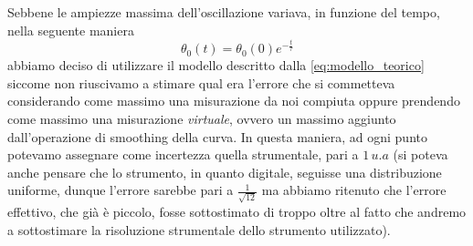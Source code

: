 \documentclass{article}
\begin{document}
Sebbene le ampiezze massima dell'oscillazione variava, in funzione del tempo, nella seguente maniera
$$
	\theta_0 (t) = \theta_0 (0) e^{-\frac{t}{\tau}}
$$
abbiamo deciso di utilizzare il modello descritto dalla \ref{eq:modello_teorico} siccome non riuscivamo a stimare qual era l'errore che si commetteva considerando come massimo una misurazione da noi compiuta oppure prendendo come massimo una misurazione \emph{virtuale}, ovvero un massimo aggiunto dall'operazione di smoothing della curva. In questa maniera, ad ogni punto potevamo assegnare come incertezza quella strumentale, pari a $1 \, u.a$ (si poteva anche pensare che lo strumento, in quanto digitale, seguisse una distribuzione uniforme, dunque l'errore sarebbe pari a $\frac{1}{\sqrt{12}}$ ma abbiamo ritenuto che l'errore effettivo, che già è piccolo, fosse sottostimato di troppo oltre al fatto che andremo a sottostimare la risoluzione strumentale dello strumento utilizzato). 
\end{document}
